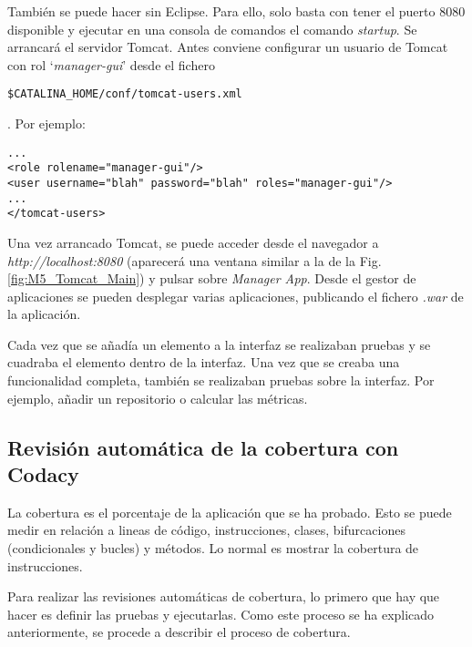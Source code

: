 También se puede hacer sin Eclipse. Para ello, solo basta con tener el puerto 8080 disponible y ejecutar en una consola de comandos el comando \textit{startup}. Se arrancará el servidor Tomcat. Antes conviene configurar un usuario de Tomcat con rol `\textit{manager-gui}' desde el fichero
\begin{minipage}{\linewidth}
{\tiny
\begin{lstlisting}[breaklines]
$CATALINA_HOME/conf/tomcat-users.xml
\end{lstlisting}
}
\end{minipage}
. Por ejemplo:\\
\begin{minipage}{\linewidth}
{\tiny
\begin{lstlisting}[breaklines]
...
<role rolename="manager-gui"/>
<user username="blah" password="blah" roles="manager-gui"/>
...
</tomcat-users>
\end{lstlisting}
}
\end{minipage}
Una vez arrancado Tomcat, se puede acceder desde el navegador a \textit{http://localhost:8080} (aparecerá una ventana similar a la de la Fig. \ref{fig:M5_Tomcat_Main}) y pulsar sobre \textit{Manager App}. Desde el gestor de aplicaciones se pueden desplegar varias aplicaciones, publicando el fichero \textit{.war} de la aplicación.


Cada vez que se añadía un elemento a la interfaz se realizaban pruebas y se cuadraba el elemento dentro de la interfaz. Una vez que se creaba una funcionalidad completa, también se realizaban pruebas sobre la interfaz. Por ejemplo, añadir un repositorio o calcular las métricas.

\subsection{Revisión automática de la cobertura con Codacy}

La cobertura es el porcentaje de la aplicación que se ha probado. Esto se puede medir en relación a lineas de código, instrucciones, clases, bifurcaciones (condicionales y bucles) y métodos. Lo normal es mostrar la cobertura de instrucciones.

Para realizar las revisiones automáticas de cobertura, lo primero que hay que hacer es definir las pruebas y ejecutarlas. Como este proceso se ha explicado anteriormente, se procede a describir el proceso de cobertura.

